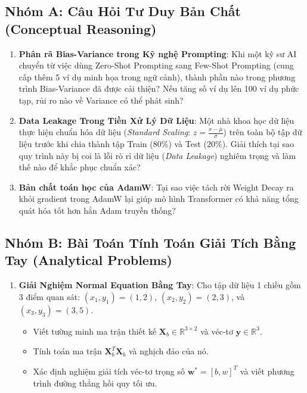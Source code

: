\subsection{Nhóm A: Câu Hỏi Tư Duy Bản Chất (Conceptual Reasoning)}

\begin{enumerate}[label=\textbf{A\arabic*.}]
  \item \textbf{Phân rã Bias-Variance trong Kỹ nghệ Prompting}: Khi một kỹ sư AI chuyển từ việc dùng Zero-Shot Prompting sang Few-Shot Prompting (cung cấp thêm 5 ví dụ minh họa trong ngữ cảnh), thành phần nào trong phương trình Bias-Variance đã được cải thiện? Nếu tăng số ví dụ lên 100 ví dụ phức tạp, rủi ro nào về Variance có thể phát sinh?
  \item \textbf{Data Leakage Trong Tiền Xử Lý Dữ Liệu}: Một nhà khoa học dữ liệu thực hiện chuẩn hóa dữ liệu (\textit{Standard Scaling}: $z = \frac{x - \mu}{\sigma}$) trên toàn bộ tập dữ liệu trước khi chia thành tập Train ($80\%$) và Test ($20\%$). Giải thích tại sao quy trình này bị coi là lỗi rò rỉ dữ liệu (\textit{Data Leakage}) nghiêm trọng và làm thế nào để khắc phục chuẩn xác?
  \item \textbf{Bản chất toán học của AdamW}: Tại sao việc tách rời Weight Decay ra khỏi gradient trong AdamW lại giúp mô hình Transformer có khả năng tổng quát hóa tốt hơn hẳn Adam truyền thống?
\end{enumerate}

\subsection{Nhóm B: Bài Toán Tính Toán Giải Tích Bằng Tay (Analytical Problems)}

\begin{enumerate}[label=\textbf{B\arabic*.}]
  \item \textbf{Giải Nghiệm Normal Equation Bằng Tay}: Cho tập dữ liệu 1 chiều gồm 3 điểm quan sát: $(x_1, y_1) = (1, 2)$, $(x_2, y_2) = (2, 3)$, và $(x_3, y_3) = (3, 5)$.
  \begin{itemize}
    \item[a)] Viết tường minh ma trận thiết kế $\mathbf{X}_b \in \mathbb{R}^{3 \times 2}$ và véc-tơ $\mathbf{y} \in \mathbb{R}^3$.
    \item[b)] Tính toán ma trận $\mathbf{X}_b^T \mathbf{X}_b$ và nghịch đảo của nó.
    \item[c)] Xác định nghiệm giải tích véc-tơ trọng số $\mathbf{w}^* = [b, w]^T$ và viết phương trình đường thẳng hồi quy tối ưu.
  \end{itemize}
\end{enumerate}

